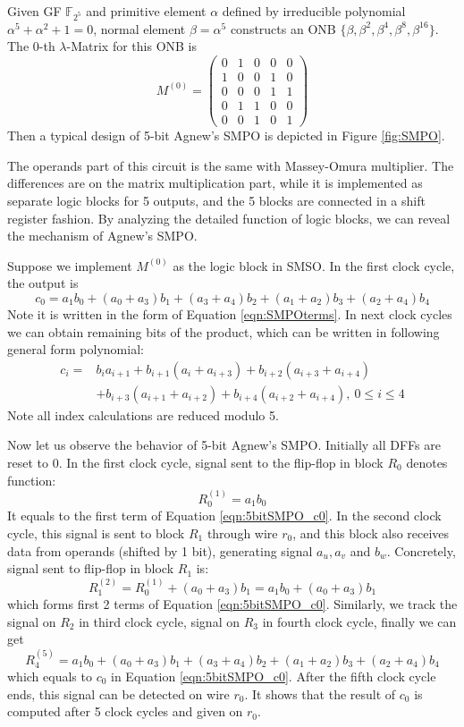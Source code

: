 \begin{Example}
Given GF $\mathbb F_{2^5}$ and primitive element $\alpha$ defined by irreducible polynomial 
$\alpha^5+\alpha^2+1=0$, normal element $\beta = \alpha^5$ constructs an ONB $\{\beta,\beta^2,\beta^4,\beta^8,\beta^{16}\}$.
The $0$-th $\lambda$-Matrix for this ONB is
\begin{equation*}
M^{(0)} = \left(\begin{array}{lcccr}
0 &1 &0 &0 &0 \\
1 &0 &0 &1 &0 \\
0 &0 &0 &1 &1 \\
0 &1 &1 &0 &0 \\
0 &0 &1 &0 &1
\end{array}\right)
\end{equation*}
Then a typical design of 5-bit Agnew's SMPO is depicted in Figure \ref{fig:SMPO}.

The operands part of this circuit is the same with Massey-Omura multiplier. The differences are on 
the matrix multiplication part, while it is implemented as separate logic blocks for 5 outputs,
and the 5 blocks are connected in a shift register fashion. By analyzing the detailed function of 
logic blocks, we can reveal the mechanism of Agnew's SMPO.

Suppose we implement $M^{(0)}$ as the logic block in SMSO. In the first clock cycle, the output is
\begin{equation}
\label{eqn:5bitSMPO_c0}
c_0 = a_1b_0+(a_0+a_3)b_1 + (a_3+a_4)b_2 + (a_1+a_2)b_3 + (a_2+a_4)b_4
\end{equation}
Note it is written in the form of Equation \ref{eqn:SMPOterms}. In next clock cycles we can obtain 
remaining bits of the product, which can be written in following general form polynomial:
\begin{align}
c_i =& b_ia_{i+1} + b_{i+1}(a_i + a_{i+3}) + b_{i+2}(a_{i+3} + a_{i+4}) \nonumber\\
&+ b_{i+3}(a_{i+1} + a_{i+2}) + b_{i+4}
(a_{i+2} + a_{i+4}),\ 0\leq i\leq 4 \nonumber
\end{align}
Note all index calculations are reduced modulo 5.

Now let us observe the behavior of 5-bit Agnew's SMPO. Initially all DFFs are reset to 0. 
In the first clock cycle,
signal sent to the flip-flop in block $R_0$ denotes function:
$$R_0^{(1)} = a_1b_0$$
It equals to the first term of Equation \ref{eqn:5bitSMPO_c0}. In the second clock cycle,
this signal is sent to block $R_1$ through wire $r_0$, and this block also receives data 
from operands (shifted by 1 bit), generating signal $a_u,a_v$ and $b_w$. Concretely,
signal sent to flip-flop in block $R_1$ is:
$$R_1^{(2)} = R_0^{(1)} + (a_0+a_3)b_1 = a_1b_0+(a_0+a_3)b_1$$
which forms first 2 terms of Equation \ref{eqn:5bitSMPO_c0}. Similarly, we track the signal 
on $R_2$ in third clock cycle, signal on $R_3$ in fourth clock cycle, finally we can get 
$$R_4^{(5)} = a_1b_0+(a_0+a_3)b_1 + (a_3+a_4)b_2 + (a_1+a_2)b_3 + (a_2+a_4)b_4$$
which equals to $c_0$ in Equation \ref{eqn:5bitSMPO_c0}.
After the fifth clock cycle ends, this signal can be detected on wire $r_0$. It shows that 
the result of $c_0$ is computed after 5 clock cycles and given on $r_0$.


\end{Example}
